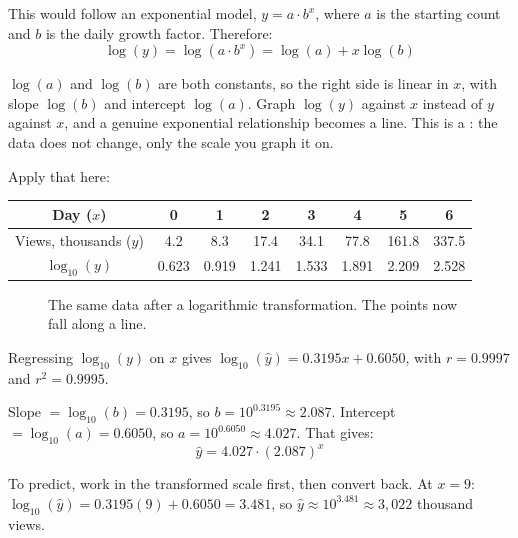 This would follow an exponential model, $y = a \cdot b^x$, where $a$ is the starting count and $b$ is the daily growth factor. Therefore:
\[
\log(y) = \log(a \cdot b^x) = \log(a) + x\log(b)
\]

$\log(a)$ and $\log(b)$ are both constants, so the right side is linear in $x$, with slope $\log(b)$ and intercept $\log(a)$. Graph $\log(y)$ against $x$ instead of $y$ against $x$, and a genuine exponential relationship becomes a line. This is a : the data does not change, only the scale you graph it on.

Apply that here:

\begin{table}[H]
\centering
\begin{tabular}{c|ccccccc}
Day ($x$) & 0 & 1 & 2 & 3 & 4 & 5 & 6 \\
\hline
Views, thousands ($y$) & 4.2 & 8.3 & 17.4 & 34.1 & 77.8 & 161.8 & 337.5 \\
$\log_{10}(y)$ & 0.623 & 0.919 & 1.241 & 1.533 & 1.891 & 2.209 & 2.528
\end{tabular}
\end{table}

\begin{figure}[H]
    \centering
    \caption{The same data after a logarithmic transformation. The points now fall along a line.}
    \label{fig:viewsLog}
\end{figure}

Regressing $\log_{10}(y)$ on $x$ gives $\log_{10}(\hat{y}) = 0.3195x + 0.6050$, with $r = 0.9997$ and $r^2 = 0.9995$.

Slope $= \log_{10}(b) = 0.3195$, so $b = 10^{0.3195} \approx 2.087$. Intercept $= \log_{10}(a) = 0.6050$, so $a = 10^{0.6050} \approx 4.027$. That gives:
\[
\hat{y} = 4.027 \cdot (2.087)^x
\]

To predict, work in the transformed scale first, then convert back. At $x = 9$: $\log_{10}(\hat{y}) = 0.3195(9) + 0.6050 = 3.481$, so $\hat{y} \approx 10^{3.481} \approx 3{,}022$ thousand views.

